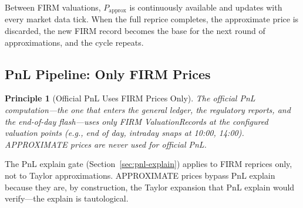 \documentclass[11pt,a4paper]{article}
\newtheorem{principle}[definition]{Principle}
\begin{document}
\begin{center}
\end{center}

\noindent Between FIRM valuations, $P_{\mathrm{approx}}$ is continuously available and updates with every market data tick.  When the full reprice completes, the approximate price is discarded, the new FIRM record becomes the base for the next round of approximations, and the cycle repeats.

\subsection{PnL Pipeline: Only FIRM Prices}

\begin{principle}[Official PnL Uses FIRM Prices Only]
\label{princ:firm-pnl}
The official PnL computation---the one that enters the general ledger, the regulatory reports, and the end-of-day flash---uses only FIRM ValuationRecords at the configured valuation points (e.g., end of day, intraday snaps at 10:00, 14:00).  APPROXIMATE prices are never used for official PnL.
\end{principle}

\noindent The PnL explain gate (Section~\ref{sec:pnl-explain}) applies to FIRM reprices only, not to Taylor approximations.  APPROXIMATE prices bypass PnL explain because they are, by construction, the Taylor expansion that PnL explain would verify---the explain is tautological.
\end{document}
